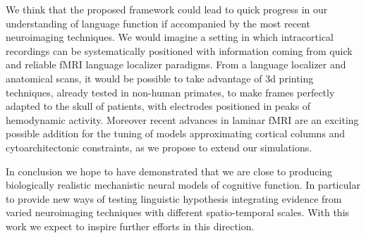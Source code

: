 \documentclass[10pt]{article}
\begin{document}
We think that the proposed framework could lead to quick progress in our understanding of language function if accompanied by the most recent neuroimaging techniques.
We would imagine a setting in which intracortical recordings can be systematically positioned with information coming from quick and reliable fMRI language localizer paradigms\cite{mahowald2016reliable}.
From a language localizer and anatomical scans, it would be possible to take advantage of 3d printing techniques, already tested in non-human primates\cite{chen20173d}, to make frames perfectly adapted to the skull of patients, with electrodes positioned in peaks of hemodynamic activity.
Moreover recent advances in laminar fMRI\cite{lawrence2017laminar} are an exciting possible addition for the tuning of models approximating cortical columns and cytoarchitectonic constraints, as we propose to extend our simulations.

In conclusion we hope to have demonstrated that we are close to producing biologically realistic mechanistic neural models of cognitive function.
In particular to provide new ways of testing linguistic hypothesis integrating evidence from varied neuroimaging techniques with different spatio-temporal scales.
With this work we expect to inspire further efforts in this direction.




\end{document}
